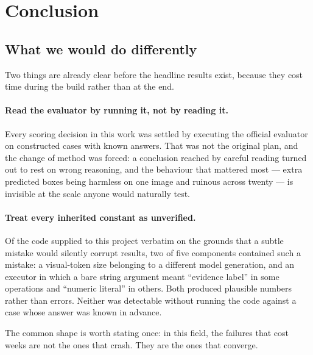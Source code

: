\section{Conclusion}
\label{sec:conclusion}


\subsection{What we would do differently}

Two things are already clear before the headline results exist, because they cost time during the
build rather than at the end.

\paragraph{Read the evaluator by running it, not by reading it.}
Every scoring decision in this work was settled by executing the official evaluator on constructed
cases with known answers. That was not the original plan, and the change of method was forced: a
conclusion reached by careful reading turned out to rest on wrong reasoning, and the behaviour that
mattered most --- extra predicted boxes being harmless on one image and ruinous across twenty ---
is invisible at the scale anyone would naturally test.

\paragraph{Treat every inherited constant as unverified.}
Of the code supplied to this project verbatim on the grounds that a subtle mistake would silently
corrupt results, two of five components contained such a mistake: a visual-token size belonging to a
different model generation, and an executor in which a bare string argument meant ``evidence label''
in some operations and ``numeric literal'' in others. Both produced plausible numbers rather than
errors. Neither was detectable without running the code against a case whose answer was known in
advance.

The common shape is worth stating once: in this field, the failures that cost weeks are not the ones
that crash. They are the ones that converge.
